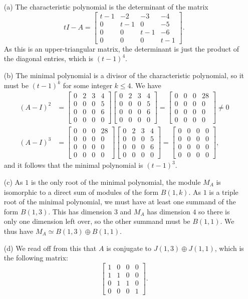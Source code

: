\documentclass{amsart}
\newcommand{\bbm}       {\left[\begin{matrix}}
\newcommand{\ebm}       {\end{matrix}\right]}
\newcommand{\op}        {\oplus}
\renewcommand{\:}{\colon}
\theoremstyle{definition}
\renewenvironment{solution}{\SolutionAtEnd}{\endSolutionAtEnd}
\begin{document}
\begin{solution}
 \begin{itemize}
  \item[(a)] The characteristic polynomial is the determinant of the
   matrix 
   \[ tI - A =
       \bbm t-1&-2&-3&-4 \\ 0&t-1&0&-5 \\ 0&0&t-1&-6 \\ 0&0&0&t-1
       \ebm.
   \]
   As this is an upper-triangular matrix, the determinant is just the
   product of the diagonal entries, which is $(t-1)^4$.
  \item[(b)] The minimal polynomial is a divisor of the characteristic
   polynomial, so it must be $(t-1)^k$ for some integer $k\leq 4$.
   We have 
   \begin{align*}
    (A-I)^2 &= 
     \bbm 0&2&3&4 \\ 0&0&0&5 \\ 0&0&0&6 \\ 0&0&0&0 \ebm
     \bbm 0&2&3&4 \\ 0&0&0&5 \\ 0&0&0&6 \\ 0&0&0&0 \ebm = 
     \bbm 0&0&0&28 \\ 0&0&0&0 \\ 0&0&0&0 \\ 0&0&0&0 \ebm \neq 0 \\
    (A-I)^3 &= 
     \bbm 0&0&0&28 \\ 0&0&0&0 \\ 0&0&0&0 \\ 0&0&0&0 \ebm 
     \bbm 0&2&3&4 \\ 0&0&0&5 \\ 0&0&0&6 \\ 0&0&0&0 \ebm = 
     \bbm 0&0&0&0 \\ 0&0&0&0 \\ 0&0&0&0 \\ 0&0&0&0 \ebm,
   \end{align*}
   and it follows that the minimal polynomial is $(t-1)^3$.
  \item[(c)] As $1$ is the only root of the minimal polynomial, the
   module $M_A$ is isomorphic to a direct sum of modules of the form
   $B(1,k)$.  As $1$ is a triple root of the minimal polynomial, we
   must have at least one summand of the form $B(1,3)$.  This has
   dimension $3$ and $M_A$ has dimension $4$ so there is only one
   dimension left over, so the other summand must be $B(1,1)$.  We
   thus have $M_A\simeq B(1,3)\op B(1,1)$.
  \item[(d)] We read off from this that $A$ is conjugate to
   $J(1,3)\op J(1,1)$, which is the following matrix:
   \[ \bbm 1&0&0&0\\1&1&0&0\\0&1&1&0\\0&0&0&1 \ebm. \]
 \end{itemize}
\end{solution}
\end{document}
